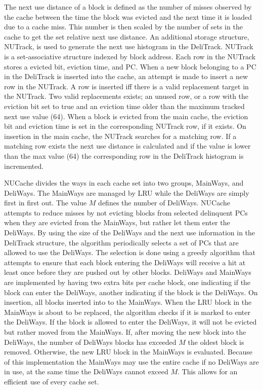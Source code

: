 The next use distance of a block is defined as the number of misses observed by the cache between the time the block was evicted and the next time it is loaded due to a cache miss.
This number is then scaled by the number of sets in the cache to get the set relative next use distance.
An additional storage structure, NUTrack, is used to generate the next use histogram in the DeliTrack.
NUTrack is a set-associative structure indexed by block address.
Each row in the NUTrack stores a evicted bit, eviction time, and PC.
When a new block belonging to a PC in the DeliTrack is inserted into the cache, an attempt is made to insert a new row in the NUTrack. 
A row is inserted iff there is a valid replacement target in the NUTrack.
Two valid replacements exists; an unused row, or a row with the eviction bit set to true and an eviction time older than the maximum tracked next use value (64).
When a block is evicted from the main cache, the eviction bit and eviction time is set in the corresponding NUTrack row, if it exists.
On insertion in the main cache, the NUTrack searches for a matching row. 
If a matching row exists the next use distance is calculated and if the value is lower than the max value (64) the corresponding row in the DeliTrack histogram is incremented.

NUCache divides the ways in each cache set into two groups, MainWays, and DeliWays.
The MainWays are managed by LRU while the DeliWays are simply first in first out.
The value $M$ defines the number of DeliWays.
NUCache attempts to reduce misses by not evicting blocks from selected delinquent PCs when they are evicted from the MainWays, but rather let them enter the DeliWays.
By using the size of the DeliWays and the next use information in the DeliTrack structure, the algorithm periodically selects a set of PCs that are allowed to use the DeliWays.
The selection is done using a greedy algorithm that attempts to ensure that each block entering the DeliWays will receive a hit at least once before they are pushed out by other blocks.
DeliWays and MainWays are implemented by having two extra bits per cache block, one indicating if the block can enter the DeliWays, another indicating if the block is the DeliWays.
On insertion, all blocks inserted into to the MainWays.
When the LRU block in the MainWays is about to be replaced, the algorithm checks if it is marked to enter the DeliWays.
If the block is allowed to enter the DeliWays, it will not be evicted but rather moved from the MainWays.
If, after moving the new block into the DeliWays, the number of DeliWays blocks has exceeded $M$ the oldest block is removed.
Otherwise, the new LRU block in the MainWays is evaluated.
Because of this implementation the MainWays may use the entire cache if no DeliWays are in use, at the same time the DeliWays cannot exceed $M$.
This allows for an efficient use of every cache set.